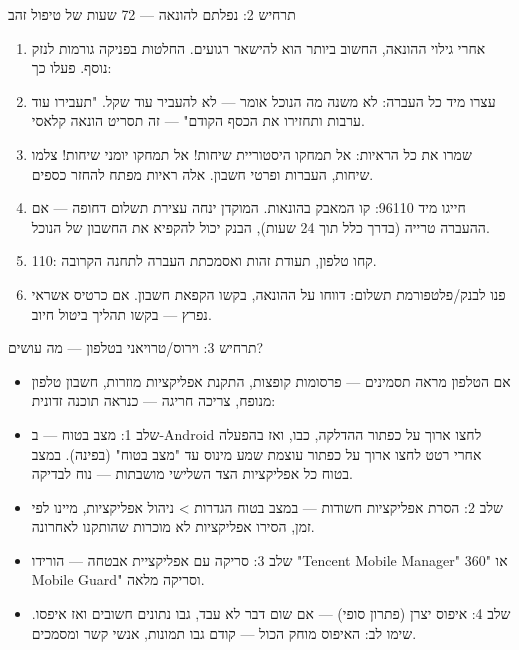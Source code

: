 
תרחיש 2: נפלתם להונאה — 72 שעות של טיפול זהב

\begin{enumerate}
  \item אחרי גילוי ההונאה, החשוב ביותר הוא להישאר רגועים. החלטות בפניקה גורמות לנזק נוסף. פעלו כך:
  \item עצרו מיד כל העברה: לא משנה מה הנוכל אומר — לא להעביר עוד שקל. "תעבירו עוד ערבות ותחזירו את הכסף הקודם" — זה תסריט הונאה קלאסי.
  \item שמרו את כל הראיות: אל תמחקו היסטוריית שיחות! אל תמחקו יומני שיחות! צלמו שיחות, העברות ופרטי חשבון. אלה ראיות מפתח להחזר כספים.
  \item חייגו מיד 96110: קו המאבק בהונאות. המוקדן ינחה עצירת תשלום דחופה — אם ההעברה טרייה (בדרך כלל תוך 24 שעות), הבנק יכול להקפיא את החשבון של הנוכל.
  \item 110: קחו טלפון, תעודת זהות ואסמכתת העברה לתחנה הקרובה.
  \item פנו לבנק/פלטפורמת תשלום: דווחו על ההונאה, בקשו הקפאת חשבון. אם כרטיס אשראי נפרץ — בקשו תהליך ביטול חיוב.
\end{enumerate}


תרחיש 3: וירוס/טרויאני בטלפון — מה עושים?

\begin{itemize}
  \item אם הטלפון מראה תסמינים — פרסומות קופצות, התקנת אפליקציות מוזרות, חשבון טלפון מנופח, צריכה חריגה — כנראה תוכנה זדונית:
  \item שלב 1: מצב בטוח — ב-Android לחצו ארוך על כפתור ההדלקה, כבו, ואז בהפעלה אחרי רטט לחצו ארוך על כפתור עוצמת שמע מינוס עד "מצב בטוח" (בפינה). במצב בטוח כל אפליקציות הצד השלישי מושבתות — נוח לבדיקה.
  \item שלב 2: הסרת אפליקציות חשודות — במצב בטוח הגדרות > ניהול אפליקציות, מיינו לפי זמן, הסירו אפליקציות לא מוכרות שהותקנו לאחרונה.
  \item שלב 3: סריקה עם אפליקציית אבטחה — הורידו "Tencent Mobile Manager" או "360 Mobile Guard" וסריקה מלאה.
  \item שלב 4: איפוס יצרן (פתרון סופי) — אם שום דבר לא עבד, גבו נתונים חשובים ואז איפסו. שימו לב: האיפוס מוחק הכול — קודם גבו תמונות, אנשי קשר ומסמכים.
\end{itemize}

